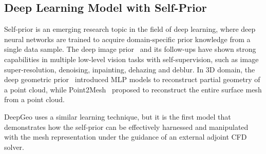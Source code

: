 \subsection{Deep Learning Model with Self-Prior}

Self-prior is an emerging research topic in the field of deep learning, where deep neural networks are trained to acquire domain-specific prior knowledge from a single data sample. The deep image prior~\cite{ai.Ulyanov2018} and its follow-ups have shown strong capabilities in multiple low-level vision tasks with self-supervision, such as image super-resolution, denoising, inpainting, dehazing and deblur. In 3D domain, the deep geometric prior~\cite{ai.Williams2019} introduced MLP models to reconstruct partial geometry of a point cloud, while Point2Mesh~\cite{ai.Hanocka2020} proposed to reconstruct the entire surface mesh from a point cloud.

DeepGeo uses a similar learning technique, but it is the first model that demonstrates how the self-prior can be effectively harnessed and manipulated with the mesh representation under the guidance of an external adjoint CFD solver.